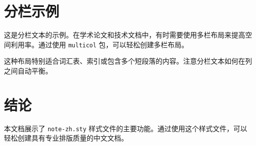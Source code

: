 \documentclass{article}
\begin{document}
\section{分栏示例}
\begin{multicols}{2}
  这是分栏文本的示例。在学术论文和技术文档中，有时需要使用多栏布局来提高空间利用率。通过使用 \texttt{multicol} 包，可以轻松创建多栏布局。

  这种布局特别适合词汇表、索引或包含多个短段落的内容。注意分栏文本如何在列之间自动平衡。
\end{multicols}

\section{结论}
本文档展示了 \texttt{note-zh.sty} 样式文件的主要功能。通过使用这个样式文件，可以轻松创建具有专业排版质量的中文文档。



\end{document}
